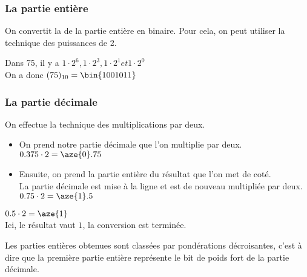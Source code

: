 \subsubsection{La partie entière}

On convertit la  de la partie entière en binaire. Pour cela, on peut utiliser la technique des puissances de 2.

Dans 75, il y a $ 1\cdot 2^6, 1\cdot 2^3, 1\cdot 2^1 et 1\cdot 2^0$ \\

On a donc $(75)_{10} = \bin{1001011}$



\subsubsection{La partie décimale}

On effectue la technique des multiplications par deux. \\

\begin{itemize}

	\item On prend notre partie décimale que l'on multiplie par deux. \\

$0.375 \cdot 2 = \aze{0}.75$ \\

	\item Ensuite, on prend la partie entière du résultat que l'on met de coté. \\

La partie décimale est mise à la ligne et est de nouveau multipliée par deux. \\

$0.75 \cdot 2 = \aze{1}.5$ \\


\end{itemize}

$0.5 \cdot 2 = \aze{1}$ \\

Ici, le résultat vaut $1$, la conversion est terminée. 


Les parties entières obtenues sont classées par pondérations décroisantes, c'est à dire que la première partie entière représente le bit de poids fort de la partie décimale. \\

